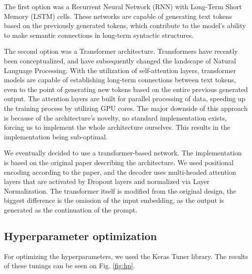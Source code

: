 \documentclass[journal]{IEEEtai}
\begin{document}
The first option was a Recurrent Neural Network (RNN) with Long-Term Short Memory\cite{lstm} (LSTM) cells. These networks are capable of generating text tokens based on the previously generated tokens, which contribute to the model's ability to make semantic connections in long-term syntactic structures.

The second option was a Transformer\cite{vaswani2017attention} architecture. Transformers have recently been conceptualized, and have subsequently changed the landscape of Natural Language Processing. With the utilization of self-attention layers, transformer models are capable of establishing long-term connections between text tokens, even to the point of generating new tokens based on the entire previous generated output. The attention layers are built for parallel processing of data, speeding up the training process by utilizing GPU cores. The major downside of this approach is because of the architecture's novelty, no standard implementation exists, forcing us to implement the whole architecture ourselves. This results in the implementation being sub-optimal.

We eventually decided to use a transformer-based network. The implementation is based on the original paper\cite{vaswani2017attention} describing the architecture. We used positional encoding according to the paper, and the decoder uses multi-headed attention layers that are activated by Dropout\cite{overfitting} layers and normalized via Layer Normalization\cite{ba2016layer}. The transformer itself is modified from the original design, the biggest difference is the omission of the input embedding, as the output is generated as the continuation of the prompt.

\subsection{Hyperparameter optimization}
For optimizing the hyperparameters, we used the Keras Tuner library. The results of these tunings can be seen on Fig. \ref{fig:hp}. 
\end{document}
